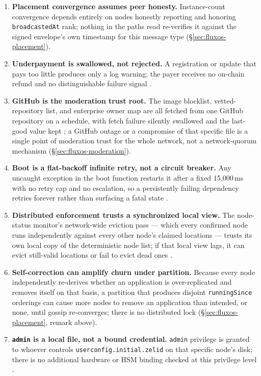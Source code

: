 \begin{enumerate}
\item \textbf{Placement convergence assumes peer honesty.} Instance-count convergence depends
  entirely on nodes honestly reporting and honoring \texttt{broadcastedAt} rank; nothing in the
  paths read re-verifies it against the signed envelope's own timestamp for this message type
  \srcinferred (\S\ref{sec:fluxos-placement}).
\item \textbf{Underpayment is swallowed, not rejected.} A registration or update that pays too
  little produces only a log warning; the payer receives no on-chain refund and no distinguishable
  failure signal .
\item \textbf{GitHub is the moderation trust root.} The image blocklist, vetted-repository list,
  and enterprise owner map are all fetched from one GitHub repository on a schedule, with fetch
  failure silently swallowed and the last-good value kept
  ; a GitHub outage or a compromise
  of that specific file is a single point of moderation trust for the whole network, not a
  network-quorum mechanism (\S\ref{sec:fluxos-moderation}).
\item \textbf{Boot is a flat-backoff infinite retry, not a circuit breaker.} Any uncaught exception
  in the boot function restarts it after a fixed 15{,}000\,ms with no retry cap and no escalation,
  so a persistently failing dependency retries forever rather than surfacing a fatal state
  .
\item \textbf{Distributed enforcement trusts a synchronized local view.} The node-status monitor's
  network-wide eviction pass — which every confirmed node runs independently against every other
  node's claimed locations — trusts its own local copy of the deterministic node list; if that
  local view lags, it can evict still-valid locations or fail to evict dead ones \srcinferred.
\item \textbf{Self-correction can amplify churn under partition.} Because every node independently
  re-derives whether an application is over-replicated and removes itself on that basis, a
  partition that produces disjoint \texttt{runningSince} orderings can cause more nodes to remove
  an application than intended, or none, until gossip re-converges; there is no distributed lock
  (\S\ref{sec:fluxos-placement}, remark above).
\item \textbf{\texttt{admin} is a local file, not a bound credential.} \texttt{admin} privilege is
  granted to whoever controls \texttt{userconfig.\allowbreak{}initial.\allowbreak{}zelid} on that specific node's disk; there
  is no additional hardware or HSM binding checked at this privilege level
  .
\end{enumerate}

\FloatBarrier
